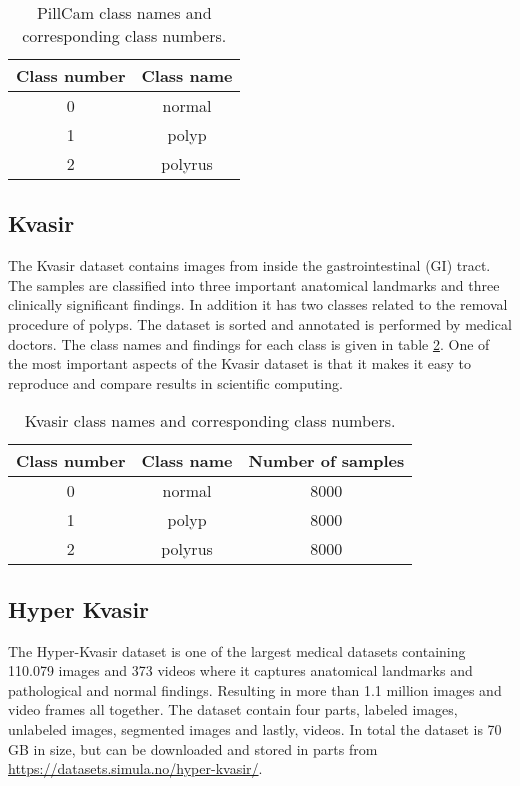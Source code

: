 \documentclass[thesis.tex]{subfiles}
\begin{document}
\begin{table}
  \centering
  \begin{tabular}{ |c|c| }
  	\hline
  	Class number & Class name \\
    \hline
    0 & normal \\ 
    1 & polyp \\ 
    2 & polyrus \\ 
    \hline
  \end{tabular}
  \caption{PillCam class names and corresponding class numbers.}
  \label{table:kvasir_pillcam}
\end{table}


\subsection{Kvasir} \label{kvasir}
The Kvasir dataset \cite{KVASIRMultiClass17} contains images from inside the gastrointestinal (GI) tract. The samples are classified into three important anatomical landmarks and three clinically significant findings. In addition it has two classes related to the removal procedure of polyps. The dataset is sorted and annotated is performed by medical doctors. The class names and findings for each class is given in table \ref{table:kvasir}. One of the most important aspects of the Kvasir dataset is that it makes it easy to reproduce and compare results in scientific computing.

\begin{table}
  \centering
  \begin{tabular}{ |c|c|c| }
  	\hline
  	Class number & Class name & Number of samples \\
    \hline
    0 & normal & 8000 \\ 
    1 & polyp & 8000 \\ 
    2 & polyrus & 8000 \\ 
    \hline
  \end{tabular}
  \caption{Kvasir class names and corresponding class numbers.}
  \label{table:kvasir}
\end{table}


\subsection{Hyper Kvasir} \label{hyper_kvasir}
The Hyper-Kvasir dataset \cite{HyperKvasirComprehensive19} is one of the largest medical datasets containing 110.079 images and 373 videos where it captures anatomical landmarks and pathological and normal findings. Resulting in more than 1.1 million images and video frames all together. The dataset contain four parts, labeled images, unlabeled images, segmented images and lastly, videos. In total the dataset is 70 GB in size, but can be downloaded and stored in parts from \url{https://datasets.simula.no/hyper-kvasir/}.
\end{document}
